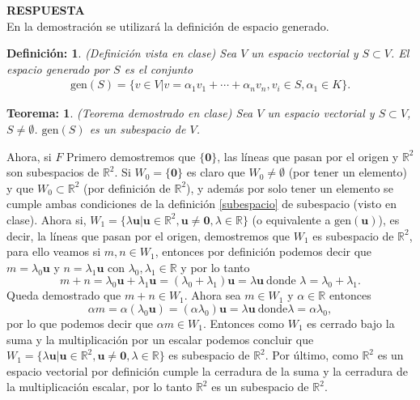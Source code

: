 \documentclass[11pt,letterpaper]{article}
\newcommand{\mR}{\mathbb{R}}
\newcommand{\res}{\textbf{RESPUESTA}\\}
\newcommand{\gen}{\text{gen}}
\newtheorem{thmt}{Teorema:}
\newtheorem{thmd}{Definición:}
\begin{document}
\begin{enumerate}
\res 
En la demostración se utilizará la definición de espacio generado. 
\begin{framed}
    \begin{thmd} \label{espacio_generado}
    (Definición vista en clase) Sea $V$ un espacio vectorial y $S\subset V$. El espacio generado por $S$ es el conjunto
    \begin{align*}
    \gen (S)=\{v\in V| v=\alpha_1 v_1+\cdots +\alpha_n v_n, v_i\in S, \alpha_1\in K \}. 
    \end{align*}
    \end{thmd}
\end{framed} 
\begin{framed}
    \begin{thmt} \label{espacio_generado_sub}
    (Teorema demostrado en clase) Sea $V$ un espacio vectorial y $S\subset V$, $S\neq \emptyset$. $\gen(S)$ es un subespacio de $V$. 
    \end{thmt}
\end{framed}
Ahora, si $F$ 
Primero demostremos que $\{\textbf{0}\}$, las líneas que pasan por el origen y $\mR^2$ son subespacios de $\mR^2$. Si $W_0=\{\textbf{0}\}$ es claro que $W_0\neq \emptyset$ (por tener un elemento) y que $W_0\subset \mR^2$ (por definición de $\mR^2$), y además por solo tener un elemento se cumple ambas condiciones de la definición \ref{subespacio} de subespacio (visto en clase). Ahora si, $W_1=\{\lambda\textbf{u}| \textbf{u}\in \mR^2, \textbf{u}\neq \textbf{0}, \lambda\in \mR\}$ (o equivalente a $\gen (\textbf{u})$), es decir, la líneas que pasan por el origen, demostremos que $W_1$ es subespacio de $\mR^2$, para ello veamos si $m,n\in W_1$, entonces por definición podemos decir que $m=\lambda_0\textbf{u}$ y $n=\lambda_1\textbf{u}$ con $\lambda_0, \lambda_1\in \mR$ y por lo tanto
$$m+n=\lambda_0\textbf{u}+\lambda_1\textbf{u}=(\lambda_0+\lambda_1)\textbf{u}=\lambda\textbf{u} \ \text{donde }\lambda=\lambda_0+\lambda_1.$$
Queda demostrado que $m+n\in W_1.$ Ahora sea $m\in W_1$ y $\alpha \in \mR$ entonces
$$\alpha m=\alpha (\lambda_0\textbf{u})=(\alpha \lambda_0)\textbf{u}=\lambda \textbf{u} \ \text{donde} \lambda=\alpha \lambda_0,$$
por lo que podemos decir que $\alpha m\in W_1$. Entonces como $W_1$ es cerrado bajo la suma y la multiplicación por un escalar podemos concluir que $W_1=\{\lambda\textbf{u}| \textbf{u}\in \mR^2, \textbf{u}\neq \textbf{0}, \lambda\in \mR\}$ es subespacio de $\mR^2$. Por último, como $\mR^2$ es un espacio vectorial por definición cumple la cerradura de la suma y la cerradura de la multiplicación escalar, por lo tanto $\mR^2$ es un subespacio de $\mR^2.$ \\


\end{enumerate}
\end{document}
